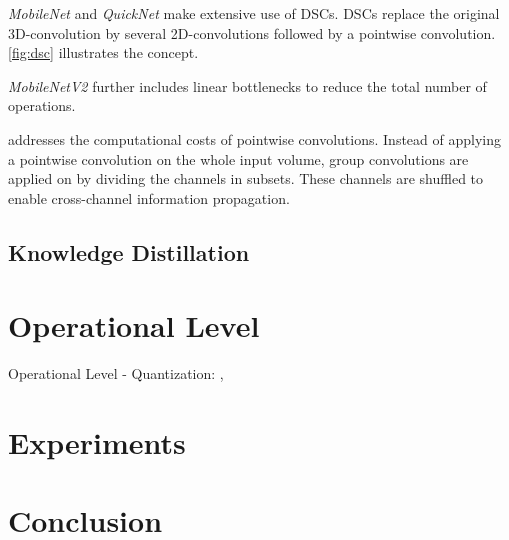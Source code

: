 \textit{MobileNet} \cite{Howard2017} and \textit{QuickNet} \cite{Ghosh2017} make extensive use of \acp{DSC}. \acp{DSC} replace the original 3D-convolution by several 2D-convolutions followed by a pointwise convolution. \autoref{fig:dsc} illustrates the concept.

\textit{MobileNetV2} \cite{Sandler2018} further includes linear bottlenecks to reduce the total number of operations.

\cite{Zhang2017a} addresses the computational costs of pointwise convolutions. Instead of applying a pointwise convolution on the whole input volume, group convolutions are applied on by dividing the channels in subsets. These channels are shuffled to enable cross-channel information propagation. 

\subsection{Knowledge Distillation}


\section{Operational Level}
Operational Level - Quantization:
\cite{TripathiSanDiego}, 




\section{Experiments}


\section{Conclusion}